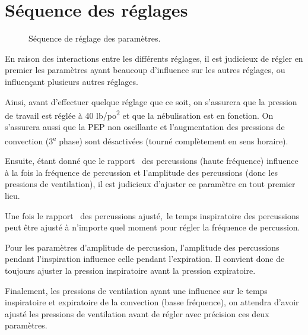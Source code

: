 \section{Séquence des réglages}

\begin{figure*}  \caption{Séquence de réglage
des paramètres.} \end{figure*}

En raison des interactions entre les différents réglages, il est
judicieux de régler en premier les paramètres ayant beaucoup
d'influence sur les autres réglages, ou influençant plusieurs autres
réglages.

Ainsi, avant d'effectuer quelque réglage que ce soit, on s'assurera
que la pression de travail est réglée à 40 lb/po\textsuperscript{2} et
que la nébulisation est en fonction. On s'assurera aussi que la PEP
non oscillante et l'augmentation des pressions de convection
(3\textsuperscript{e} phase) sont désactivées (tourné complètement en
sens horaire).

Ensuite, étant donné que le rapport \ie\ des percussions (haute
fréquence) influence à la fois la fréquence de percussion et
l'amplitude des percussions (donc les pressions de ventilation), il
est judicieux d'ajuster ce paramètre en tout premier lieu.

Une fois le rapport \ie\ des percussions ajusté,~le temps inspiratoire
des percussions peut être ajusté à n'importe quel moment pour régler
la fréquence de percussion.

Pour les paramètres d'amplitude de percussion, l'amplitude des
percussions pendant l'inspiration influence celle pendant
l'expiration.  Il convient donc de toujours ajuster la pression
inspiratoire avant la pression expiratoire.

Finalement, les pressions de ventilation ayant une influence sur le
temps inspiratoire et expiratoire de la convection (basse fréquence),
on attendra d'avoir ajusté les pressions de ventilation avant de
régler avec précision ces deux paramètres.

